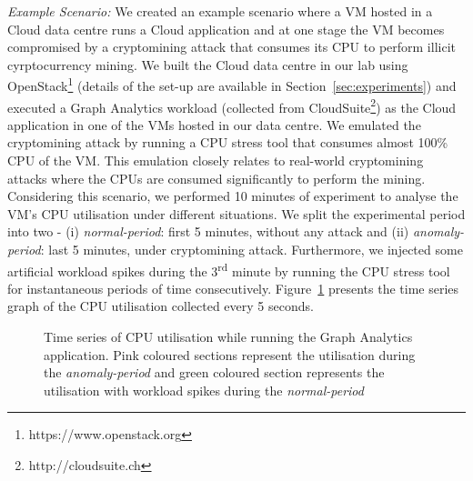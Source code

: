 \textit{Example Scenario:} We created an example scenario where a VM hosted in a Cloud data centre runs a Cloud application and at one stage the VM becomes compromised by a cryptomining attack that consumes its CPU to perform illicit cyrptocurrency mining. We built the Cloud data centre in our lab using OpenStack\footnote{https://www.openstack.org} (details of the set-up are available in Section~\ref{sec:experiments}) and executed a Graph Analytics workload (collected from CloudSuite\footnote{http://cloudsuite.ch}) as the Cloud application in one of the VMs hosted in our data centre. 
We emulated the cryptomining attack by running a CPU stress tool that consumes almost 100\% CPU of the VM. This emulation closely relates to real-world cryptomining attacks where the CPUs are consumed significantly to perform the mining. 
Considering this scenario, we performed 10 minutes of experiment to analyse the VM's CPU utilisation under different situations. 
We split the experimental period into two - (i) \textit{normal-period}: first 5 minutes, without any attack and (ii) \textit{anomaly-period}: last 5 minutes, under cryptomining attack. 
Furthermore, we injected some artificial workload spikes during the 3\textsuperscript{rd} minute by running the CPU stress tool for instantaneous periods of time consecutively. 
Figure~\ref{fig:cpu_timeseries} presents the time series graph of the CPU utilisation collected every 5 seconds. 

\begin{figure}[!h]
  \centering
   {}
   \caption{Time series of CPU utilisation while running the Graph Analytics application. Pink coloured sections represent the utilisation during the \textit{anomaly-period} and green coloured section represents the utilisation with workload spikes during the \textit{normal-period}}
  \label{fig:cpu_timeseries}
\end{figure}

